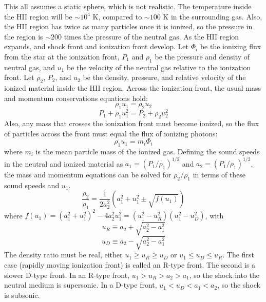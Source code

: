 This all assumes a static sphere, which is not realistic.  The temperature inside the HII region 
will be $\sim10^4$ K, compared to $\sim100$ K in the surrounding gas.  Also, the HII region has 
twice as many particles once it is ionized, so the pressure in the region is $\sim200$ times the 
pressure of the neutral gas.  As the HII region expands, and shock front and ionization front 
develop.  Let $\Phi_i$ be the ionizing flux from the star at the ionization front, $P_1$ and 
$\rho_1$ be the pressure and density of neutral gas, and $u_1$ be the velocity of the neutral 
gas relative to the ionization front.  Let $\rho_2$, $P_2$, and $u_2$ be the density, pressure, 
and relative velocity of the ionized material inside the HII region.  Across the ionization front, 
the usual mass and momentum conservations equations hold:
\begin{equation}
\rho_1u_1=\rho_2u_2
\end{equation}
\begin{equation}
P_1+\rho_1u_1^2=P_2+\rho_2u_2^2
\end{equation}
Also, any mass that crosses the ionization front must become ionized, so the flux of particles 
across the front must equal the flux of ionizing photons:
\begin{equation}
\rho_1u_1=m_i\Phi_i
\end{equation}
where $m_i$ is the mean particle mass of the ionized gas.  Defining the sound speeds in the 
neutral and ionized material as $a_1=(P_1/\rho_1)^{1/2}$ and $a_2=(P_1/\rho_1)^{1/2}$, the 
mass and momentum equations can be solved for $\rho_2/\rho_1$ in terms of these sound speeds 
and $u_1$.  
\begin{equation}\label{eq:ratio}
\frac{\rho_2}{\rho_1}=\frac{1}{2a_2^2}(a_1^2+u_1^2\pm\sqrt{f(u_1)})
\end{equation}
where $f(u_1)=(a_1^2+u_1^2)^2-4a_2^2u_1^2=(u_1^2-u_R^2)(u_1^2-u_D^2)$, with 
\begin{equation}
u_R\equiv a_2+\sqrt{a_2^2-a_1^2}
\end{equation}
\begin{equation}
u_D\equiv a_2-\sqrt{a_2^2-a_1^2}
\end{equation}
The density ratio must be real, either $u_1\geq u_R\geq u_D$ or $u_1\leq u_D\leq u_R$.  The 
first case (rapidly moving ionization front) is called an R-type front.  The second is a 
slower D-type front.  In an R-type front, $u_1>u_R>a_2>a_1$, so the shock into the neutral medium 
is supersonic.  In a D-type front, $u_1<u_D<a_1<a_2$, so the shock is subsonic.  

